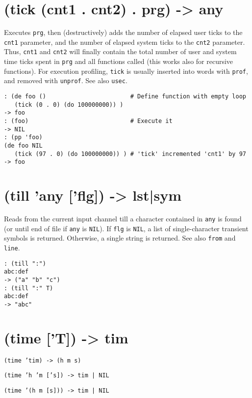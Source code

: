 {{{{{{{{ 
\section{(tick (cnt1 . cnt2) . prg) -> any}
\label{sec-8-1-20-17}


Executes \texttt{prg}, then (destructively) adds the number of elapsed user
ticks to the \texttt{cnt1} parameter, and the number of elapsed system ticks to
the \texttt{cnt2} parameter. Thus, \texttt{cnt1} and \texttt{cnt2} will finally contain the
total number of user and system time ticks spent in \texttt{prg} and all
functions called (this works also for recursive functions). For
execution profiling, \texttt{tick} is usually inserted into words with \texttt{prof},
and removed with \texttt{unprof}. See also \texttt{usec}.


\begin{verbatim}
: (de foo ()                        # Define function with empty loop
   (tick (0 . 0) (do 100000000)) )
-> foo
: (foo)                             # Execute it
-> NIL
: (pp 'foo)
(de foo NIL
   (tick (97 . 0) (do 100000000)) ) # 'tick' incremented 'cnt1' by 97
-> foo
\end{verbatim}

 
\section{(till 'any ['flg]) -> lst|sym}
\label{sec-8-1-20-18}


Reads from the current input channel till a character contained in \texttt{any}
is found (or until end of file if \texttt{any} is \texttt{NIL}). If \texttt{flg} is \texttt{NIL}, a
list of single-character transient symbols is returned. Otherwise, a
single string is returned. See also \texttt{from} and \texttt{line}.


\begin{verbatim}
: (till ":")
abc:def
-> ("a" "b" "c")
: (till ":" T)
abc:def
-> "abc"
\end{verbatim}

 
\section{(time ['T]) -> tim}
\label{sec-8-1-20-19}


\texttt{(time 'tim) -> (h m s)}

\texttt{(time 'h 'm ['s]) -> tim | NIL}

\texttt{(time '(h m [s])) -> tim | NIL}

}}}}}}}}
